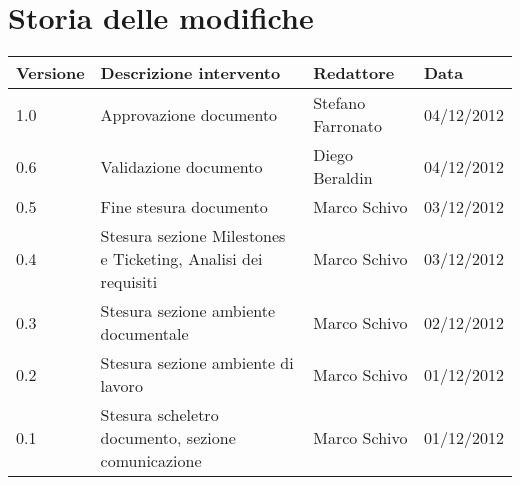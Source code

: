 %

\newcommand{\docName}{Norme di Progetto}
\newcommand{\docFileName}{Norme di Progetto}
\newcommand{\docVers}{1.0}
\newcommand{\creationDate}{05/12/2012}
\newcommand{\modificationDate}{17/12/2012}
\newcommand{\docState}{Approvato}
\newcommand{\docUsage}{Interno}
\newcommand{\docAuthors}{Marco Schivo}
\newcommand{\approvedBy}{Stefano Farronato}
\newcommand{\verifiedBy}{Diego Beraldin}
\newcommand{\docRoot}{..}







\section*{Storia delle modifiche}
\begin{tabularx}{\textwidth}{lXll}
\toprule
Versione & Descrizione intervento & Redattore & Data\\
\midrule %
1.0 & Approvazione documento & Stefano Farronato & 04/12/2012\\
0.6 & Validazione documento & Diego Beraldin & 04/12/2012\\
0.5 & Fine stesura documento & Marco Schivo & 03/12/2012\\
0.4 & Stesura sezione Milestones e Ticketing, Analisi dei requisiti & Marco Schivo & 03/12/2012\\
0.3 & Stesura sezione ambiente documentale & Marco Schivo & 02/12/2012\\
0.2 & Stesura sezione ambiente di lavoro & Marco Schivo & 01/12/2012\\
0.1 & Stesura scheletro documento, sezione comunicazione & Marco Schivo & 01/12/2012\\
\bottomrule
\end{tabularx}
\newpage

